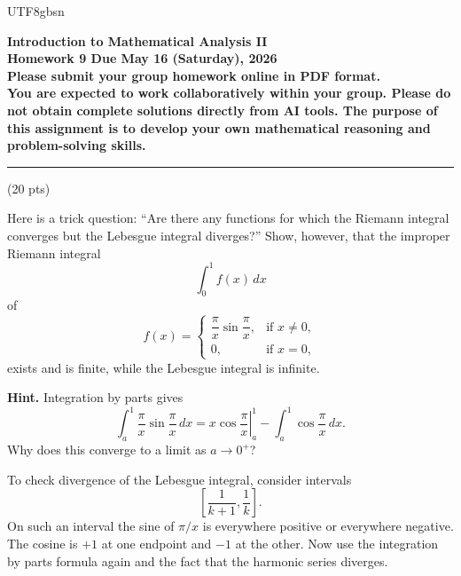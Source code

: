 \documentclass[addpoints]{exam}
\theoremstyle{definition}
\begin{document}
\begin{CJK*}{UTF8}{gbsn}
\begin{center}
    {\Large{\bf Introduction to Mathematical Analysis II\\
    Homework 9  Due  May 16  (Saturday), 2026\\
    Please submit your group homework online in PDF format.\\
You are expected to work collaboratively within your group. 
Please do not obtain complete solutions directly from AI tools. 
The purpose of this assignment is to develop your own mathematical reasoning and problem-solving skills. %
  }} \\ 
    \large
\end{center}

\noindent\rule{16.2cm}{0.4pt}


\begin{questions}


\question  (20 pts) 



Here is a trick question: ``Are there any functions for which the Riemann
integral converges but the Lebesgue integral diverges?'' 
Show, however, that the improper Riemann integral
\[
\int_0^1 f(x)\,dx
\]
of
\[
f(x)=
\begin{cases}
\dfrac{\pi}{x}\sin\dfrac{\pi}{x}, & \text{if } x\neq 0,\\[1.2ex]
0, & \text{if } x=0,
\end{cases}
\]
exists and is finite, while the Lebesgue integral is infinite.

\medskip

\noindent
\textbf{Hint.}
Integration by parts gives
\[
\int_a^1 \frac{\pi}{x}\sin\frac{\pi}{x}\,dx
=
\left. x\cos\frac{\pi}{x}\right|_a^1
-
\int_a^1 \cos\frac{\pi}{x}\,dx.
\]
Why does this converge to a limit as \(a\to 0^+\)?

To check divergence of the Lebesgue integral, consider intervals
\[
\left[\frac{1}{k+1},\frac{1}{k}\right].
\]
On such an interval the sine of \(\pi/x\) is everywhere positive or everywhere
negative. The cosine is \(+1\) at one endpoint and \(-1\) at the other. Now use
the integration by parts formula again and the fact that the harmonic series
diverges.


\begin{solution}
\end{solution}


\end{questions}
\end{CJK*}
\end{document}
